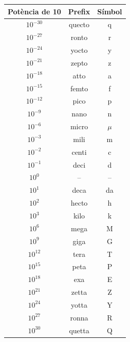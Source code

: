 \documentclass[12pt]{article}
\begin{document}
\newpage
\begin{center}
\renewcommand{\arraystretch}{1.3}
\begin{tabular}{c|c|c}
\hline
\textbf{Potència de 10} & \textbf{Prefix} & \textbf{Símbol}\\
\hline
$10^{-30}$ & quecto & q\\
$10^{-27}$ & ronto & r\\
$10^{-24}$ & yocto & y\\
$10^{-21}$ & zepto & z\\
$10^{-18}$ & atto & a\\
$10^{-15}$ & femto & f\\
$10^{-12}$ & pico & p\\
$10^{-9}$ & nano & n\\
$10^{-6}$ & micro & $\mu$\\
$10^{-3}$ & mili & m\\
$10^{-2}$ & centi & c\\
$10^{-1}$ & deci & d\\
$10^0$ & -- & --\\
$10^1$ & deca & da\\
$10^2$ & hecto & h\\
$10^3$ & kilo & k\\
$10^6$ & mega & M\\
$10^9$ & giga & G\\
$10^{12}$ & tera & T\\
$10^{15}$ & peta & P\\
$10^{18}$ & exa & E\\
$10^{21}$ & zetta & Z\\
$10^{24}$ & yotta & Y\\
$10^{27}$ & ronna & R\\
$10^{30}$ & quetta & Q\\
\hline
\end{tabular}
\end{center}
\end{document}
